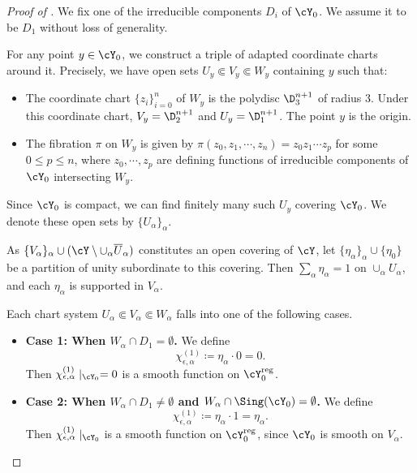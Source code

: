 \documentclass[12pt]{amsart}
\begin{document}
\begin{proof}[Proof of ]
    We fix one of the irreducible components $D_i$ of $\cY_0$. We assume it
    to be $D_1$ without loss of generality.

    For any point $y\in\cY_0$, we construct a triple of adapted coordinate
    charts around it. Precisely, we have open sets
    $U_y\Subset V_y\Subset W_y$ containing $y$ such that:
    \begin{itemize}
        \item The coordinate chart $\{z_i\}_{i=0}^n$ of $W_y$ is the
        polydisc $\D_3^{n+1}$ of radius $3$. Under this coordinate chart,
        $V_y=\D_2^{n+1}$ and $U_y=\D_1^{n+1}$. The point $y$ is the origin.
        \item The fibration $\pi$ on $W_y$ is given by
        $\pi(z_0,z_1,\cdots,z_n)=z_0z_1\cdots z_p$ for some
        $0\leq p\leq n$, where $z_0,\cdots,z_p$ are defining functions of
        irreducible components of $\cY_0$ intersecting $W_y$.
    \end{itemize}
    Since $\cY_0$ is compact, we can find finitely many such $U_y$ covering
    $\cY_0$. We denote these open sets by $\{U_\alpha\}_\alpha$.

    As $\{V_\alpha\}_\alpha\cup
    (\cY\setminus\cup_\alpha\overline{U}_\alpha)$ constitutes an open
    covering of $\cY$, let
    $\{\eta_\alpha\}_\alpha\cup\{\eta_0\}$ be a partition of unity
    subordinate to this covering. Then $\sum_\alpha\eta_\alpha=1$ on
    $\cup_\alpha U_\alpha$, and each $\eta_\alpha$ is supported in
    $V_\alpha$.

    Each chart system $U_\alpha \Subset V_\alpha
    \Subset W_\alpha$ falls into one of the following cases.
    \begin{itemize}
        \item \textbf{Case 1: When $W_\alpha\cap D_1=\emptyset$.}
        We define
        \begin{equation}
            \label{eqn:case1-contribution}
            \chi^{(1)}_{\epsilon,\alpha}\coloneqq \eta_\alpha\cdot 0=0.
        \end{equation}
        Then $\chi^{(1)}_{\epsilon,\alpha}\mid_{\cY_0}=0$ is a smooth
        function on $\cY_0^{\rm reg}$.

        \item \textbf{Case 2: When $W_\alpha\cap D_1\neq\emptyset$ and
        $W_\alpha\cap\Sing(\cY_0)=\emptyset$.}
        We define
        \begin{equation}
            \label{eqn:case2-contribution}
            \chi^{(1)}_{\epsilon,\alpha}\coloneqq \eta_\alpha\cdot 1
            =\eta_\alpha.
        \end{equation}
        Then $\chi^{(1)}_{\epsilon,\alpha}\mid_{\cY_0}$ is a smooth
        function on $\cY_0^{\rm reg}$, since $\cY_0$ is smooth on
        $V_\alpha$.


\end{itemize}
\end{proof}
\end{document}
